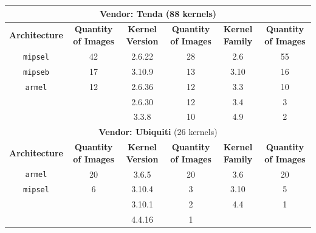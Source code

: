 \begin{table}[H]
{\begin{tabular}{|c|c|c|c|c|c|}
\multicolumn{6}{|c|}{\textbf{Vendor: Tenda} (88 kernels)}                                                                    \\ \hline
\textbf{Architecture} & \multicolumn{1}{c|}{\textbf{Quantity of Images}} & \textbf{Kernel Version} & \multicolumn{1}{c|}{\textbf{Quantity of Images}} & \textbf{Kernel Family} & \textbf{Quantity of Images} \\ \hline
{\tt mipsel}            & \multicolumn{1}{c|}{42}                & 2.6.22                 & \multicolumn{1}{c|}{28}                           & 2.6                     & 55                         \\
{\tt mipseb}            & \multicolumn{1}{c|}{17}                & 3.10.9                  & \multicolumn{1}{c|}{13}                          & 3.10                    & 16                         \\
{\tt armel}             & \multicolumn{1}{c|}{12}                & 2.6.36                  & \multicolumn{1}{c|}{12}                          & 3.3                     & 10                         \\
                        & \multicolumn{1}{c|}{}                  & 2.6.30                  & \multicolumn{1}{c|}{12}                          & 3.4                     & 3                          \\
                        & \multicolumn{1}{c|}{}                  & 3.3.8                   & \multicolumn{1}{c|}{10}                          & 4.9                     & 2                          \\ \hline

\multicolumn{6}{|c|}{\textbf{Vendor: Ubiquiti} (26 kernels)}                                                                    \\ \hline
\textbf{Architecture} & \multicolumn{1}{c|}{\textbf{Quantity of Images}} & \textbf{Kernel Version} & \multicolumn{1}{c|}{\textbf{Quantity of Images}} & \textbf{Kernel Family} & \textbf{Quantity of Images} \\ \hline
{\tt armel}             & \multicolumn{1}{c|}{20}                & 3.6.5                  & \multicolumn{1}{c|}{20}                           & 3.6                     & 20                         \\
{\tt mipsel}            & \multicolumn{1}{c|}{6}                 & 3.10.4                  & \multicolumn{1}{c|}{3}                           & 3.10                    & 5                          \\
                        & \multicolumn{1}{c|}{}                  & 3.10.1                  & \multicolumn{1}{c|}{2}                           & 4.4                     & 1                          \\
                        & \multicolumn{1}{c|}{}                  & 4.4.16                  & \multicolumn{1}{c|}{1}                           &                         &                            \\ \hline


\end{tabular}}
\end{table}
